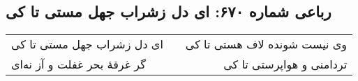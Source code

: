 \begin{center}
\section*{رباعی شماره ۶۷۰: ای دل زشراب جهل مستی تا کی}
\label{sec:sh670}
\begin{longtable}{l p{0.5cm} r}
ای دل زشراب جهل مستی تا کی
&&
وی نیست شونده لاف هستی تا کی
\\
گر غرقهٔ بحر غفلت و آز نه‌ای
&&
تردامنی و هواپرستی تا کی
\\
\end{longtable}
\end{center}

